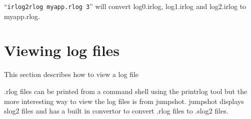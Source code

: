 \documentclass[dvipdfm,11pt]{article}
\begin{document}
``\texttt{irlog2rlog myapp.rlog 3}'' will convert log0.irlog, log1.irlog and log2.irlog
to myapp.rlog.

\section{Viewing log files}
This section describes how to view a log file

.rlog files can be printed from a command shell using the printrlog tool but
the more interesting way to view the log files is from jumpshot.  jumpshot
displays slog2 files and has a built in convertor to convert .rlog files to
.slog2 files.



\end{document}
